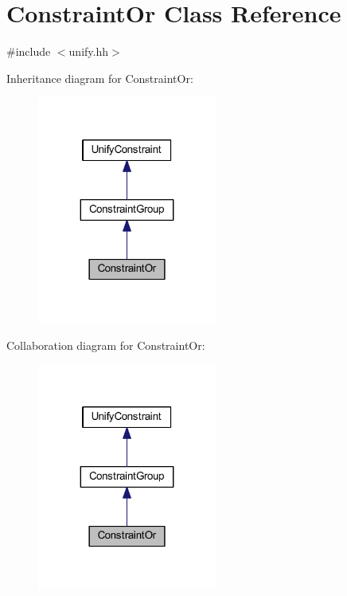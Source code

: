 \hypertarget{class_constraint_or}{}\section{Constraint\+Or Class Reference}
\label{class_constraint_or}


{\ttfamily \#include $<$unify.\+hh$>$}



Inheritance diagram for Constraint\+Or\+:
\nopagebreak
\begin{figure}[H]
\begin{center}
\leavevmode
\includegraphics[width=167pt]{class_constraint_or__inherit__graph}
\end{center}
\end{figure}


Collaboration diagram for Constraint\+Or\+:
\nopagebreak
\begin{figure}[H]
\begin{center}
\leavevmode
\includegraphics[width=167pt]{class_constraint_or__coll__graph}
\end{center}
\end{figure}
